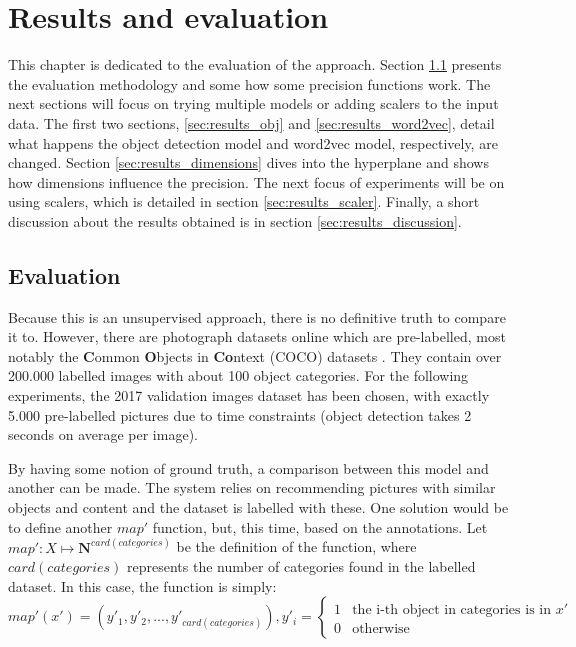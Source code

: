 \chapter{Results and evaluation}
\label{chap:results}

This chapter is dedicated to the evaluation of the approach. Section \ref{sec:results_eval} presents the evaluation methodology and some how some precision functions work. The next sections will focus on trying multiple models or adding scalers to the input data. The first two sections, \ref{sec:results_obj} and \ref{sec:results_word2vec}, detail what happens the object detection model and word2vec model, respectively, are changed. Section \ref{sec:results_dimensions} dives into the hyperplane and shows how dimensions influence the precision. The next focus of experiments will be on using scalers, which is detailed in section \ref{sec:results_scaler}. Finally, a short discussion about the results obtained is in section \ref{sec:results_discussion}.

\section{Evaluation}
\label{sec:results_eval}

Because this is an unsupervised approach, there is no definitive truth to compare it to. However, there are photograph datasets online which are pre-labelled, most notably the \textbf{C}ommon \textbf{O}bjects in \textbf{Co}ntext (COCO) datasets \cite{coco}. They contain over 200.000 labelled images with about 100 object categories. For the following experiments, the 2017 validation images dataset has been chosen, with exactly 5.000 pre-labelled pictures due to time constraints (object detection takes 2 seconds on average per image).

By having some notion of ground truth, a comparison between this model and another can be made. The system relies on recommending pictures with similar objects and content and the dataset is labelled with these. One solution would be to define another $map'$ function, but, this time, based on the annotations. Let $map' : X \mapsto \mathbf{N}^{card(categories)} $ be the definition of the function, where $card(categories)$ represents the number of categories found in the labelled dataset. In this case, the function is simply: 
$$ map'(x') = (y'_1, y'_2, ..., y'_{card(categories)}), y'_i = 
	\begin{cases}
		1 & \textrm{the i-th object in categories is in } x' \\
		0 & \textrm{otherwise}
	\end{cases}
$$


